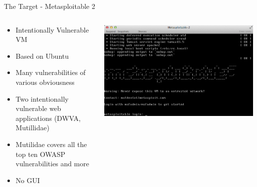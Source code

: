\documentclass{beamer}
\begin{document}
	\begin{frame}{The Target - Metasploitable 2}
            		\begin{columns}
             		\begin{column}{0.5\textwidth}
                			\begin{itemize}
                    			\item Intentionally Vulnerable VM
                    			\item Based on Ubuntu
                    			\item Many vulnerabilities of various obviousness
					\item Two intentionally vulnerable web applications (DWVA, Mutillidae)
					\item Mutilidae covers all the top ten OWASP vulnerabilities and more
					\item No GUI
                			\end{itemize}
              		\end{column}
            
            		\begin{column}{0.5\textwidth}
				\begin{center}
                 		\includegraphics[width=\textwidth]{metasploitable2_booted.png}
				\end{center}
              		\end{column}
            		\end{columns}				
	\end{frame}	
\end{document}
